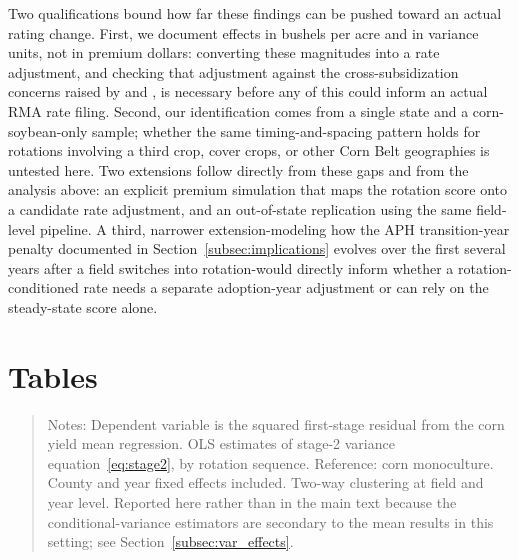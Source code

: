 \documentclass[12pt,letterpaper]{article}
\theoremstyle{remark}
\theoremstyle{remark}
\theoremstyle{plain}
\theoremstyle{definition}
\begin{document}
Two qualifications bound how far these findings can be pushed toward an actual rating change. First, we document effects in bushels per acre and in variance units, not in premium dollars: converting these magnitudes into a rate adjustment, and checking that adjustment against the cross-subsidization concerns raised by \citet{Ramaswami1993} and \citet{Babcock1996}, is necessary before any of this could inform an actual RMA rate filing. Second, our identification comes from a single state and a corn-soybean-only sample; whether the same timing-and-spacing pattern holds for rotations involving a third crop, cover crops, or other Corn Belt geographies is untested here. Two extensions follow directly from these gaps and from the analysis above: an explicit premium simulation that maps the rotation score onto a candidate rate adjustment, and an out-of-state replication using the same field-level pipeline. A third, narrower extension-modeling how the APH transition-year penalty documented in Section~\ref{subsec:implications} evolves over the first several years after a field switches into rotation-would directly inform whether a rotation-conditioned rate needs a separate adoption-year adjustment or can rely on the steady-state score alone.

\newpage


\newpage
\appendix

\section*{Tables}


\begin{quote}
\small
Notes: Dependent variable is the squared first-stage residual from the corn yield mean regression. OLS estimates of stage-2 variance equation~\eqref{eq:stage2}, by rotation sequence. Reference: corn monoculture. County and year fixed effects included. Two-way clustering at field and year level. Reported here rather than in the main text because the conditional-variance estimators are secondary to the mean results in this setting; see Section~\ref{subsec:var_effects}.
\end{quote}
\end{document}
